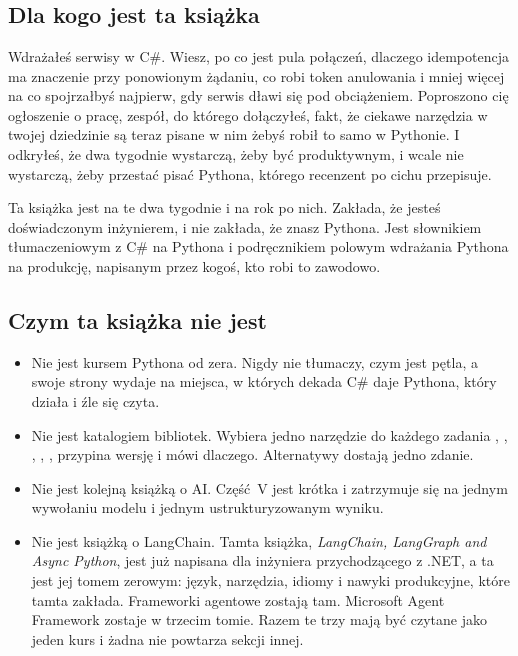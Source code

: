 \chapter*{\lblIntroduction}
{}
\markboth{\lblIntroduction}{\lblIntroduction}

\section*{Dla kogo jest ta książka}

Wdrażałeś serwisy w C\#. Wiesz, po co jest pula połączeń, dlaczego
idempotencja ma znaczenie przy ponowionym żądaniu, co robi token anulowania
i mniej więcej na co spojrzałbyś najpierw, gdy serwis dławi się pod
obciążeniem. Poproszono cię \dash{} ogłoszenie o pracę, zespół, do którego
dołączyłeś, fakt, że ciekawe narzędzia w twojej dziedzinie są teraz pisane w
nim \dash{} żebyś robił to samo w Pythonie. I odkryłeś, że dwa tygodnie
wystarczą, żeby być produktywnym, i wcale nie wystarczą, żeby przestać pisać
Pythona, którego recenzent po cichu przepisuje.

Ta książka jest na te dwa tygodnie i na rok po nich. Zakłada, że jesteś
doświadczonym inżynierem, i nie zakłada, że znasz Pythona. Jest słownikiem
tłumaczeniowym z C\# na Pythona i podręcznikiem polowym wdrażania Pythona na
produkcję, napisanym przez kogoś, kto robi to zawodowo.

\section*{Czym ta książka nie jest}

\begin{itemize}[leftmargin=1.4em]
  \item Nie jest kursem Pythona od zera. Nigdy nie tłumaczy, czym jest pętla,
        a swoje strony wydaje na miejsca, w których dekada C\# daje Pythona,
        który działa i źle się czyta.
  \item Nie jest katalogiem bibliotek. Wybiera jedno narzędzie do każdego
        zadania \dash{} , , , ,
        ,  \dash{} przypina wersję i mówi
        dlaczego. Alternatywy dostają jedno zdanie.
  \item Nie jest kolejną książką o AI. Część~V jest krótka i zatrzymuje się
        na jednym wywołaniu modelu i jednym ustrukturyzowanym wyniku.
  \item Nie jest książką o LangChain. Tamta książka, \emph{LangChain, LangGraph
        and Async Python}, jest już napisana dla inżyniera przychodzącego z
        .NET, a ta jest jej tomem zerowym: język, narzędzia, idiomy i nawyki
        produkcyjne, które tamta zakłada. Frameworki agentowe zostają tam.
        Microsoft Agent Framework zostaje w trzecim tomie. Razem te trzy mają
        być czytane jako jeden kurs i żadna nie powtarza sekcji innej.
\end{itemize}

